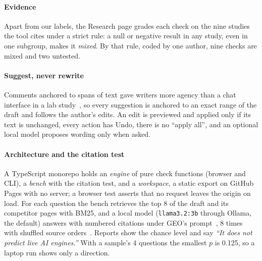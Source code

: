 \paragraph{Evidence}
Apart from our labels, the Research page grades each check on the nine studies the tool cites under a strict rule: a null or negative result in any study, even in one subgroup, makes it \emph{mixed}.
By that rule, coded by one author, nine checks are mixed and two untested.

\paragraph{Suggest, never rewrite}\label{sec:suggest}
Comments anchored to spans of text gave writers more agency than a chat interface in a lab study~\cite{lou2025anchoredai}, so every suggestion is anchored to an exact range of the draft and follows the author's edits.
An edit is previewed and applied only if its text is unchanged, every action has Undo, there is no ``apply all'', and an optional local model proposes wording only when asked.

\paragraph{Architecture and the citation test}\label{sec:bench}
A TypeScript monorepo holds an \emph{engine} of pure check functions (browser and CLI), a \emph{bench} with the citation test, and a \emph{workspace}, a static export on GitHub Pages with no server; a browser test asserts that no request leaves the origin on load.
For each question the bench retrieves the top 8 of the draft and its competitor pages with BM25, and a local model (\texttt{llama3.2:3b} through Ollama, the default) answers with numbered citations under GEO's prompt~\cite{aggarwal2024geo}, 8 times with shuffled source orders~\cite[Sec.~11.2]{martinez2026survey}.
Reports show the chance level and say \emph{``It does not predict live AI engines.''}
With a sample's 4 questions the smallest $p$ is 0.125, so a laptop run shows only a direction.
